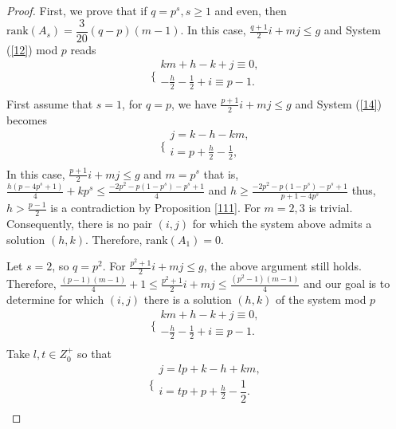 \begin{proof}
First, we prove that if $q=p^s, s \geq 1$ and even, then $\mbox{rank}(A_s) =\dfrac{3}{20}(q-p)(m-1)$. In this case, $\frac{q+1}{2}i+ mj \leq g$ and System (\ref{12}) mod $p$ reads
  \begin{equation}\label{14}
\Bigg\{
             \begin{array}{c}
              km+h-k+j \equiv 0,\\
              -\frac{h}{2} - \frac{1}{2} + i \equiv p-1. \\
             \end{array}
\end{equation}
First assume that $s=1$, for $q =p$, we have $\frac{p+1}{2}i+ mj \leq g$ and System (\ref{14}) becomes
  \begin{equation*}
\Bigg\{
             \begin{array}{c}
              j = k-h-km,\\
              i = p + \frac{h}{2} - \frac{1}{2},\\
             \end{array}
\end{equation*}
In this case, $\frac{p+1}{2}i+ mj \leq g$ and $m=p^s$ that is, $\frac{h(p-4p^s+1)}{4} + kp^s \leq \frac{-2p^2 -p(1-p^s)-p^s+1}{4}$ and $h \geq \frac{-2p^2 -p(1-p^s)-p^s+1}{p+1-4p^s}$ thus, $h > \frac{p-1}{2}$ is a contradiction by Proposition \ref{111}. For $m=2,3$ is trivial. Consequently, there is no pair $(i, j)$ for which the system above admits a solution $(h, k)$. Therefore, $\mbox{rank}(A_1) =0$.



Let $s=2$, so $q =p^2$. For $\frac{p^2+1}{2}i+ mj \leq g$, the above argument still holds. Therefore, $\frac{(p-1)(m-1)}{4} + 1 \leq \frac{p^2+1}{2}i+ mj \leq \frac{(p^2-1)(m-1)}{4}$ and our goal is to determine for which $(i, j)$ there is a solution $(h, k)$ of the system mod $p$
  \begin{equation*}
\Bigg\{
             \begin{array}{c}
             km+h - k +j \equiv 0,\\
              -\frac{h}{2} - \frac{1}{2} + i \equiv p-1. \\
             \end{array}
\end{equation*}
Take $l, t \in Z^+_0$ so that
  \begin{equation*}
\Bigg\{
             \begin{array}{c}
              j=lp+k-h+km,\\
              i= tp+p+\frac{h}{2} - \dfrac{1}{2}.\\
             \end{array}
\end{equation*}


\end{proof}
